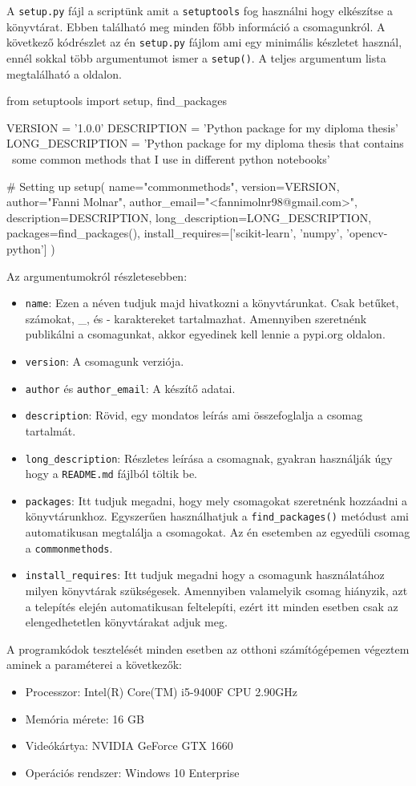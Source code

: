 A \texttt{setup.py} fájl a scriptünk amit a \texttt{setuptools} fog használni hogy elkészítse a könyvtárat. Ebben található meg minden főbb információ a csomagunkról. A következő kódrészlet az én \texttt{setup.py} fájlom ami egy minimális készletet használ, ennél sokkal több argumentumot ismer a \texttt{setup()}. A teljes argumentum lista megtalálható a \cite{setup} oldalon.
\begin{python}
from setuptools import setup, find_packages

VERSION = '1.0.0'
DESCRIPTION = 'Python package for my diploma thesis'
LONG_DESCRIPTION = 'Python package for my diploma thesis that contains \
some common methods that I use in different python notebooks'

# Setting up
setup(
        name="commonmethods",
        version=VERSION,
        author="Fanni Molnar",
        author_email="<fannimolnr98@gmail.com>",
        description=DESCRIPTION,
        long_description=LONG_DESCRIPTION,
        packages=find_packages(),
        install_requires=['scikit-learn', 'numpy', 'opencv-python']
)
\end{python}
Az argumentumokról részletesebben:
\begin{itemize}
\item \texttt{name}: Ezen a néven tudjuk majd hivatkozni a könyvtárunkat. Csak betűket, számokat, \_, és - karaktereket tartalmazhat. Amennyiben szeretnénk publikálni a csomagunkat, akkor egyedinek kell lennie a pypi.org oldalon.
\item \texttt{version}: A csomagunk verziója.
\item \texttt{author} és \texttt{author\_email}: A készítő adatai.
\item \texttt{description}: Rövid, egy mondatos leírás ami összefoglalja a csomag tartalmát.
\item \texttt{long\_description}: Részletes leírása a csomagnak, gyakran használják úgy hogy a \texttt{README.md} fájlból töltik be.
\item \texttt{packages}: Itt tudjuk megadni, hogy mely csomagokat szeretnénk hozzáadni a könyvtárunkhoz. Egyszerűen használhatjuk a \texttt{find\_packages()} metódust ami automatikusan megtalálja a csomagokat. Az én esetemben az egyedüli csomag a \texttt{commonmethods}.
\item \texttt{install\_requires}: Itt tudjuk megadni hogy a csomagunk használatához milyen könyvtárak szükségesek. Amennyiben valamelyik csomag hiányzik, azt a telepítés elején automatikusan feltelepíti, ezért itt minden esetben csak az elengedhetetlen könyvtárakat adjuk meg.
\end{itemize}


A programkódok tesztelését minden esetben az otthoni számítógépemen végeztem aminek a paraméterei a következők:
\begin{itemize}
\item Processzor: Intel(R) Core(TM) i5-9400F CPU 2.90GHz
\item Memória mérete: 16 GB
\item Videókártya: NVIDIA GeForce GTX 1660
\item Operációs rendszer: Windows 10 Enterprise
\end{itemize} 